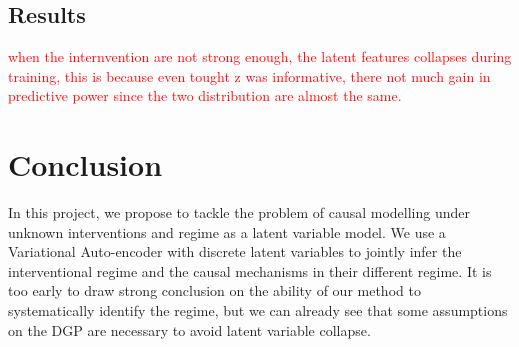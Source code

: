 \documentclass{article}
\newcommand\todo[1]{\textcolor{red}{#1}}
\begin{document}
\subsection{Results}


\todo{when the internvention are not strong enough, the latent features collapses during training, this is because even tought z was informative, there not much gain in predictive power since the two distribution are almost the same.}

\section{Conclusion}\label{subsec:Conclusion}

In this project, we propose to tackle the problem of causal modelling under unknown interventions and regime as a latent variable model. We use a Variational Auto-encoder with discrete latent variables to jointly infer the interventional regime and the causal mechanisms in their different regime. It is too early to draw strong conclusion on the ability of our method to systematically identify the regime, but we can already see that some assumptions on the DGP are necessary to avoid latent variable collapse.



\end{document}
